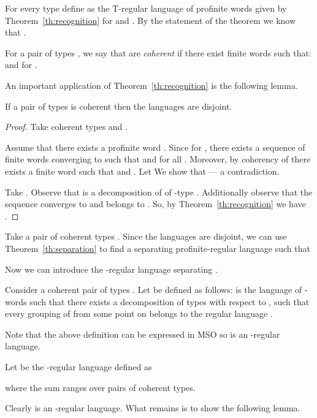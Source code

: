 \documentclass{LMCS}
\newcommand{\fT}{\ensuremath{\mathrm{T}}\xspace}
\begin{document}
For every type  define  as the \fT-regular language of profinite words given by Theorem~\ref{th:recognition} for  and . By the statement of the theorem we know that .

\begin{definition}
For a pair of types , we say that  are \emph{coherent} if there exist finite words  such that:  and  for .
\end{definition}

An important application of Theorem~\ref{th:recognition} is the following lemma.

\begin{lemma}
If a pair of types  is coherent then the languages  are disjoint.
\end{lemma}

\begin{proof}
Take coherent types  and .

Assume that there exists a profinite word . Since  for , there exists a sequence  of finite words converging to  such that  and  for all . Moreover, by coherency of  there exists a finite word  such that  and . Let  We show that  --- a contradiction.

Take . Observe that  is a decomposition of  of -type . Additionally observe that the sequence  converges to  and  belongs to . So, by Theorem~\ref{th:recognition} we have .
\end{proof}

Take a pair of coherent types . Since the languages  are disjoint, we can use Theorem~\ref{th:separation} to find a separating profinite-regular language  such that


Now we can introduce the -regular language  separating .

\begin{definition}
Consider a coherent pair of types . Let  be defined as follows:  is the language of -words  such that there exists a decomposition  of types  with respect to , such that every grouping of  from some point on belongs to the regular language .

Note that the above definition can be expressed in MSO so  is an -regular language.

Let  be the -regular language defined as

where the sum ranges over pairs of coherent types.
\end{definition}

Clearly  is an -regular language. What remains is to show the following lemma.
\end{document}
